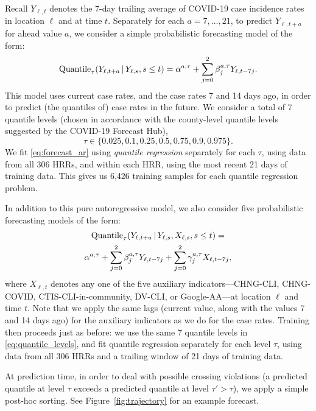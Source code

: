 \documentclass[9pt,twocolumn,twoside,lineno]{pnas-new}
\begin{document}
Recall $Y_{\ell,t}$ denotes the 7-day trailing average of COVID-19 case
incidence rates in location $\ell$ and at time $t$.  Separately for each
$a=7,\ldots,21$, to predict $Y_{\ell,t+a}$ for ahead value $a$, we consider a
simple probabilistic forecasting model of the form:     
\begin{equation}
\label{eq:forecast_ar}
\mathrm{Quantile}_\tau(Y_{\ell,t+a} \,|\, Y_{\ell,s}, s \leq t)  
= \alpha^{a,\tau} + \sum_{j=0}^2 \beta^{a,\tau}_j Y_{\ell,t-7j}.  
\end{equation}
This model uses current case rates, and the case rates 7 and 14 days ago, in
order to predict (the quantiles of) case rates in the future.  We consider a
total of 7 quantile levels (chosen in accordance with the county-level quantile
levels suggested by the COVID-19 Forecast Hub),      
\begin{equation}
\label{eq:quantile_levels}
\tau \in \{0.025, 0.1, 0.25, 0.5, 0.75, 0.9, 0.975 \}.
\end{equation}
We fit \eqref{eq:forecast_ar} using \textit{quantile regression}
\cite{Koenker:1978, Koenker:2005, Koenker:2006} separately for each $\tau$, 
using data from all 306 HRRs, and within each HRR, using the most recent 21 days
of training data.  This gives us 6,426 training samples for each quantile 
regression problem.    

In addition to this pure autoregressive model, we also consider five
probabilistic forecasting models of the form:  
\begin{multline}
\label{eq:forecast_ar_x}
\mathrm{Quantile}_\tau(Y_{\ell,t+a} \,|\, Y_{\ell,s}, X_{\ell,s}, s \leq t)  
= \\ \alpha^{a,\tau} + \sum_{j=0}^2 \beta^{a,\tau}_j Y_{\ell,t-7j} + 
\sum_{j=0}^2 \gamma^{a,\tau}_j X_{\ell,t-7j},
\end{multline}
where $X_{\ell,t}$ denotes any one of the five auxiliary indicators---CHNG-CLI, 
CHNG-COVID, CTIS-CLI-in-community, DV-CLI, or Google-AA---at location $\ell$ and
time $t$. Note that we apply the same lags (current value, along with the values
7 and 14 days ago) for the auxiliary indicators as we do for the case
rates. Training then proceeds just as before: we use the same 7 quantile levels
in \eqref{eq:quantile_levels}, and fit quantile regression separately for each 
level $\tau$, using data from all 306 HRRs and a trailing window of 21 days of
training data.

At prediction time, in order to deal with possible crossing violations (a
predicted quantile at level $\tau$ exceeds a predicted quantile at level $\tau'
> \tau$), we apply a simple post-hoc sorting.  See Figure~\ref{fig:trajectory}
for an example forecast. 
\end{document}
